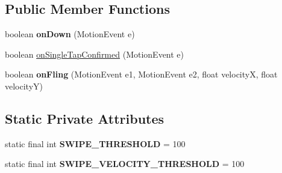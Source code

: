 \subsection*{Public Member Functions}
\begin{DoxyCompactItemize}
\item 
boolean {\bfseries on\+Down} (Motion\+Event e)\hypertarget{classcom_1_1example_1_1sebastian_1_1tindertp_1_1gestureTools_1_1OnSwipeTapTouchListener_1_1GestureListener_ae623d1ca7edf3fdce811084367edb022}{}\label{classcom_1_1example_1_1sebastian_1_1tindertp_1_1gestureTools_1_1OnSwipeTapTouchListener_1_1GestureListener_ae623d1ca7edf3fdce811084367edb022}

\item 
boolean \hyperlink{classcom_1_1example_1_1sebastian_1_1tindertp_1_1gestureTools_1_1OnSwipeTapTouchListener_1_1GestureListener_a737e9f2a2a771a696b8d4361ade94166}{on\+Single\+Tap\+Confirmed} (Motion\+Event e)
\item 
boolean {\bfseries on\+Fling} (Motion\+Event e1, Motion\+Event e2, float velocityX, float velocityY)\hypertarget{classcom_1_1example_1_1sebastian_1_1tindertp_1_1gestureTools_1_1OnSwipeTapTouchListener_1_1GestureListener_a229d37dc26576d2eb12d63c127cef8b0}{}\label{classcom_1_1example_1_1sebastian_1_1tindertp_1_1gestureTools_1_1OnSwipeTapTouchListener_1_1GestureListener_a229d37dc26576d2eb12d63c127cef8b0}

\end{DoxyCompactItemize}
\subsection*{Static Private Attributes}
\begin{DoxyCompactItemize}
\item 
static final int {\bfseries S\+W\+I\+P\+E\+\_\+\+T\+H\+R\+E\+S\+H\+O\+LD} = 100\hypertarget{classcom_1_1example_1_1sebastian_1_1tindertp_1_1gestureTools_1_1OnSwipeTapTouchListener_1_1GestureListener_a02528dfebd39e2651f6ee78d39125057}{}\label{classcom_1_1example_1_1sebastian_1_1tindertp_1_1gestureTools_1_1OnSwipeTapTouchListener_1_1GestureListener_a02528dfebd39e2651f6ee78d39125057}

\item 
static final int {\bfseries S\+W\+I\+P\+E\+\_\+\+V\+E\+L\+O\+C\+I\+T\+Y\+\_\+\+T\+H\+R\+E\+S\+H\+O\+LD} = 100\hypertarget{classcom_1_1example_1_1sebastian_1_1tindertp_1_1gestureTools_1_1OnSwipeTapTouchListener_1_1GestureListener_acd8441fe27edc96694828dd530fff6dc}{}\label{classcom_1_1example_1_1sebastian_1_1tindertp_1_1gestureTools_1_1OnSwipeTapTouchListener_1_1GestureListener_acd8441fe27edc96694828dd530fff6dc}

\end{DoxyCompactItemize}


